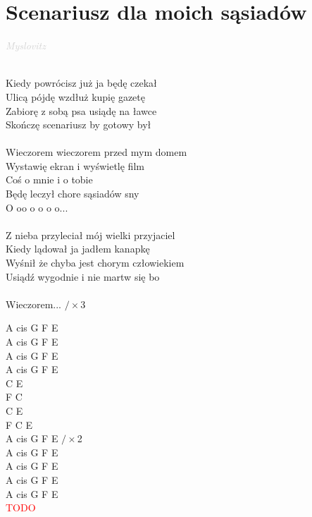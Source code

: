\documentclass[a5paper, 10pt]{book}
\begin{document}
\section{Scenariusz dla moich sąsiadów}\textcolor{lightgray}{\textit{Myslovitz}}\\~\\
\begin{minipage}[t]{0.8\textwidth}
Kiedy powrócisz już ja będę czekał\\
Ulicą pójdę wzdłuż kupię gazetę\\
Zabiorę z sobą psa usiądę na ławce\\
Skończę scenariusz by gotowy był\\
\\
\hspace*{5mm}Wieczorem wieczorem przed mym domem\\
\hspace*{5mm}Wystawię ekran i wyświetlę film\\
\hspace*{5mm}Coś o mnie i o tobie\\
\hspace*{5mm}Będę leczył chore sąsiadów sny\\

\hspace*{8mm}O oo o o o o...\\
\\
Z nieba przyleciał mój wielki przyjaciel\\
Kiedy lądował ja jadłem kanapkę\\
Wyśnił że chyba jest chorym człowiekiem\\
Usiądź wygodnie i nie martw się bo\\
\\
\hspace*{5mm}Wieczorem... \hspace{20mm} $/ \times$3\\
\end{minipage}
\begin{minipage}[t]{0.2\textwidth}
A cis G F E\\
A cis G F E\\
A cis G F E\\
A cis G F E\\

C E\\
F C\\
C E\\
F C E\\

A cis G F E $/ \times$2\\

A cis G F E\\
A cis G F E\\
A cis G F E\\
A cis G F E\\

\textcolor{red}{TODO}\\
\end{minipage}
\end{document}
